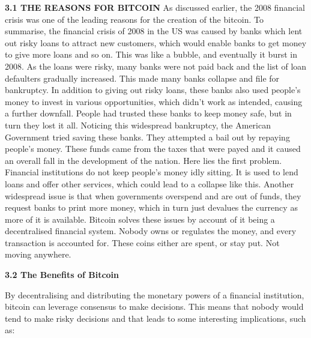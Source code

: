 \documentclass[12pt,a4paper]{report}
\begin{document}
\begin{justify}
\vspace{10mm}
\textbf{3.1 THE REASONS FOR BITCOIN}
\vspace{10mm}
\justify
As discussed earlier, the 2008 financial crisis was one of the leading reasons for the creation of the bitcoin. 
To summarise, the financial crisis of 2008 in the US was caused by banks which lent out risky loans to attract new customers, which would enable banks to get money to give more loans and so on. This was like a bubble, and eventually it burst in 2008. As the loans were risky, many banks were not paid back and the list of loan defaulters gradually increased. This made many banks collapse and file for bankruptcy. In addition to giving out risky loans, these banks also used people’s money to invest in various opportunities, which didn't work as intended, causing a further downfall.
\vspace{10mm}
\justify
People had trusted these banks to keep money safe, but in turn they lost it all. Noticing this widespread bankruptcy, the American Government tried saving these banks. They attempted a bail out by repaying people's money. These funds came from the taxes that were payed and it caused an overall fall in the development of the nation.
Here lies the first problem. Financial institutions do not keep people's money idly sitting. It is used to lend loans and offer other services, which could lead to a collapse like this.
Another widespread issue is that when governments overspend and are out of funds, they request banks to print more money, which in turn just devalues the currency as more of it is available.
\vspace{10mm}
\justify
Bitcoin solves these issues by account of it being a decentralised financial system. Nobody owns or regulates the money, and every transaction is accounted for.  These coins either are spent, or stay put. Not moving anywhere.

\newpage
\vspace{10mm}
\textbf{3.2 The Benefits of Bitcoin \cite{Shantanu}}
\vspace{10mm}

By decentralising and distributing the monetary powers of a financial institution, bitcoin can leverage consensus to make decisions. This means that nobody would tend to make risky decisions and that leads to some interesting implications, such as:

\begin{itemize}


\end{itemize}
\end{justify}
\end{document}
